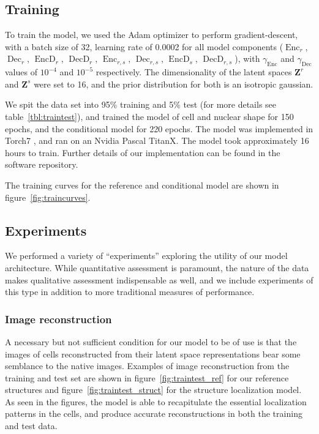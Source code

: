 \documentclass[accepted]{article}
\DeclareMathOperator{\EncD}{EncD}
\DeclareMathOperator{\DecD}{DecD}
\DeclareMathOperator{\Enc}{Enc}
\DeclareMathOperator{\Dec}{Dec}
\begin{document}
\subsection{Training}

To train the model, we used the Adam optimizer \cite{Kingma:2014us} to perform gradient-descent, with a batch size of 32, learning rate of 0.0002 for all model components ($\Enc_r$, $\Dec_r$, $\EncD_r$, $\DecD_r$, $\Enc_{r,s}$, $\Dec_{r,s}$, $\EncD_s$, $\DecD_{r,s}$), with $\gamma_{\Enc}$ and $\gamma_{\Dec}$ values of $10^{-4}$ and $10^{-5}$ respectively.
The dimensionality of the latent spaces $\bm{Z}^r$ and $\bm{Z}^s$ were set to 16, and the prior distribution for both is an isotropic gaussian.

We spit the data set into 95\% training and 5\% test (for more details see table~\ref{tbl:traintest}), and trained the model of cell and nuclear shape for 150 epochs, and the conditional model for 220 epochs.
The model was implemented in Torch7 \cite{Collobert_torch7:a}, and ran on an Nvidia Pascal TitanX.
The model took approximately 16 hours to train.
Further details of our implementation can be found in the software repository.

The training curves for the reference and conditional model are shown in figure~\ref{fig:traincurves}.

\subsection{Experiments}

We performed a variety of ``experiments'' exploring the utility of our model architecture.
While quantitative assessment is paramount, the nature of the data makes qualitative assessment indispensable as well, and we include experiments of this type in addition to more traditional  measures of performance.


\subsubsection{Image reconstruction}

A necessary but not sufficient condition for our model to be of use is that the images of cells reconstructed from their latent space representations bear some semblance to the native images.
Examples of image reconstruction from the training and test set are shown in figure~\ref{fig:traintest_ref} for our reference structures and figure~\ref{fig:traintest_struct} for the structure localization model.
As seen in the figures, the model is able to recapitulate the essential localization patterns in the cells, and produce accurate reconstructions in both the training and test data.
\end{document}
